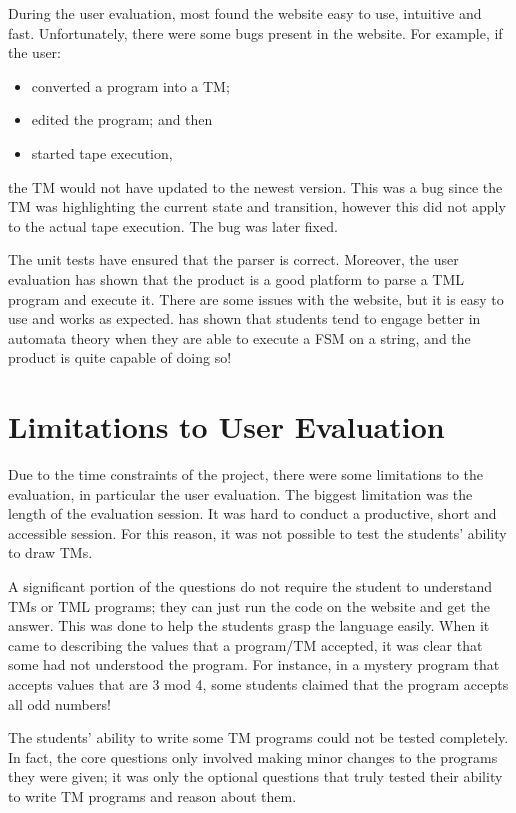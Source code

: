 During the user evaluation, most found the website easy to use, intuitive and fast. Unfortunately, there were some bugs present in the website. For example, if the user:
\begin{itemize}
    \item converted a program into a TM;
    \item edited the program; and then
    \item started tape execution,
\end{itemize}
the TM would not have updated to the newest version. This was a bug since the TM was highlighting the current state and transition, however this did not apply to the actual tape execution. The bug was later fixed.

The unit tests have ensured that the parser is correct. Moreover, the user evaluation has shown that the product is a good platform to parse a TML program and execute it. There are some issues with the website, but it is easy to use and works as expected. \citet{rodger2009increasing} has shown that students tend to engage better in automata theory when they are able to execute a FSM on a string, and the product is quite capable of doing so!

\section{Limitations to User Evaluation}
Due to the time constraints of the project, there were some limitations to the evaluation, in particular the user evaluation. The biggest limitation was the length of the evaluation session. It was hard to conduct a productive, short and accessible session. For this reason, it was not possible to test the students' ability to draw TMs. 

A significant portion of the questions do not require the student to understand TMs or TML programs; they can just run the code on the website and get the answer. This was done to help the students grasp the language easily. When it came to describing the values that a program/TM accepted, it was clear that some had not understood the program. For instance, in a mystery program that accepts values that are 3 mod 4, some students claimed that the program accepts all odd numbers!

The students' ability to write some TM programs could not be tested completely. In fact, the core questions only involved making minor changes to the programs they were given; it was only the optional questions that truly tested their ability to write TM programs and reason about them.

